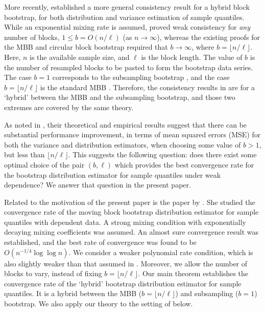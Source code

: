 \documentclass[a4paper, 12pt]{article}
\theoremstyle{plain}
\theoremstyle{definition}
\begin{document}
More recently, \citet{KLY:2017a} established a more general consistency result for a hybrid block bootstrap, for both distribution and variance estimation of sample quantiles. While an exponential mixing rate is assumed, \citet{KLY:2017a} proved weak consistency for \textit{any} number of blocks, $1\le b=O(n/\ell)$ (as $n \rightarrow \infty$), whereas the existing proofs for the MBB and circular block bootstrap required that $b \rightarrow \infty$, where $b=\lfloor n/\ell \rfloor$. Here, $n$ is the available sample size, and $\ell$ is the block length. The value of $b$ is the number of resampled blocks to be pasted to form the bootstrap data series. The case $b=1$ corresponds to the subsampling bootstrap \citep{PolitisRomano:1994a}, and the case $b=\lfloor n/\ell \rfloor$ is the standard MBB \citep{Kunsch:1989}. Therefore, the consistency results in \citet{KLY:2017a} are for a `hybrid' between the MBB and the subsampling bootstrap, and those two extremes are covered by the same theory.

As noted in \citet{KLY:2017a}, their theoretical and empirical results suggest that there can be substantial performance improvement, in terms of mean squared errors (MSE) for both the variance and distribution estimators, when choosing some value of $b >1$, but less than $\lfloor n/\ell \rfloor$. This suggests the following question: does there exist some optimal choice of the pair $(b, \ell)$ which provides the best convergence rate for the bootstrap distribution estimator for sample quantiles under weak dependence? We answer that question in the present paper.

Related to the motivation of the present paper is the paper by \citet{Sun:2007}. She studied the convergence rate of the moving block bootstrap distribution estimator for sample quantiles with dependent data. A strong mixing condition with exponentially decaying mixing coefficients was assumed. An almost sure convergence result was established, and the best rate of convergence was found to be $O(n^{-1/4}\log \log n)$. We consider a weaker polynomial rate condition, which is also slightly weaker than that assumed in \citet{SunLahiri:2006}. Moreover, we allow the number of blocks to vary, instead of fixing $b= \lfloor n/\ell \rfloor$. Our main theorem establishes the convergence rate of the `hybrid' bootstrap distribution estimator for sample quantiles. It is a hybrid between the MBB ($b=\lfloor n/\ell \rfloor$) and subsampling ($b=1$) bootstrap. We also apply our theory to the setting of \citet{Sun:2007} below.
\end{document}
